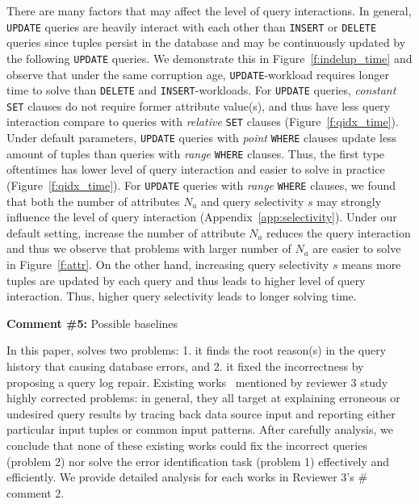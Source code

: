 There are many factors that may affect the level of query interactions. In
general, \texttt{UPDATE} queries are heavily interact with each other than
\texttt{INSERT} or \texttt{DELETE} queries since tuples persist in the
database and may be continuously updated by the following \texttt{UPDATE}
queries. We demonstrate this in Figure~\ref{f:indelup_time} and observe that
under the same corruption age, \texttt{UPDATE}-workload requires longer time
to solve than \texttt{DELETE} and \texttt{INSERT}-workloads. For
\texttt{UPDATE} queries, \textit{constant} \texttt{SET} clauses do not require
former attribute value(s), and thus have less query interaction compare to
queries with \textit{relative} \texttt{SET} clauses
(Figure~\ref{f:qidx_time}). Under default parameters, \texttt{UPDATE} queries
with \textit{point} \texttt{WHERE} clauses update less amount of tuples than
queries with \textit{range} \texttt{WHERE} clauses. Thus, the first type
oftentimes has lower level of query interaction and easier to solve in
practice (Figure~\ref{f:qidx_time}). For \texttt{UPDATE} queries with
\textit{range} \texttt{WHERE} clauses, we found that both the number of
attributes $N_a$ and query selectivity $s$ may strongly influence the level of
query interaction (Appendix~\ref{app:selectivity}). Under our default setting,
increase the number of attribute $N_a$ reduces the query interaction and thus
we observe that problems with larger number of $N_a$ are easier to solve in
Figure~\ref{f:attr}. On the other hand, increasing query selectivity $s$ means
more tuples are updated by each query and thus leads to higher level of query
interaction. Thus, higher query selectivity leads to longer solving time.



\comskip

\noindent
\textbf{Comment \#5:} Possible baselines
\begin{quote}
\end{quote}

In this paper, \sys solves two problems: 1. it finds the root reason(s) in the
query history that causing database errors, and 2. it fixed the incorrectness
by proposing a query log repair. Existing works~\cite{Wu13, roy2014formal,
chalamalla2014,meliou2011tracing} mentioned by reviewer 3 study highly
corrected problems: in general, they all target at explaining erroneous or
undesired query results by tracing back data source input and reporting either
particular input tuples or common input patterns. After carefully analysis, we
conclude that none of these existing works could fix the incorrect queries
(problem 2) nor solve the error identification task (problem 1) effectively
and efficiently. We provide detailed analysis for each works in Reviewer 3's
\# comment 2.


